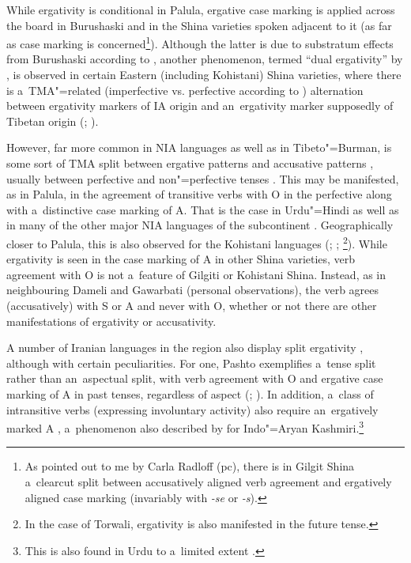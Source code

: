 While ergativity is conditional in Palula, ergative case marking is applied across the board in Burushaski and in the Shina varieties spoken adjacent to it (as far as case marking is concerned\footnote{As pointed out to me by Carla Radloff (pc), there is in Gilgit Shina a~clearcut split between accusatively aligned verb agreement and ergatively aligned case marking (invariably with \textit{-se} or \textit{-s}).}). Although the latter is due to substratum effects from Burushaski according to \citet[248]{masica2001}, another phenomenon, termed ``dual ergativity'' by \citet[213]{hookkoul2004}, is observed in certain Eastern (including Kohistani) Shina varieties, where there is a~TMA"=related (imperfective vs. perfective according to \citealt[51--53]{schmidtkohistani2008}) alternation between ergativity markers of IA origin and an~ergativity marker supposedly of Tibetan origin (\citealt[214]{hookkoul2004}; \citealt[211]{bailey1924}). 



However, far more common in NIA languages as well as in Tibeto"=Burman, is some sort of TMA split between ergative patterns and accusative patterns \citep[248]{masica2001}, usually between perfective and non"=perfective tenses \citep[342--343]{masica1991}. This may be manifested, as in Palula, in the agreement of transitive verbs with O in the perfective along with a~distinctive case marking of A. That is the case in Urdu"=Hindi \citep[124]{schmidt1999} as well as in many of the other major NIA languages of the subcontinent \citep[248]{masica2001}. Geographically closer to Palula, this is also observed for the Kohistani languages (\citealt[136]{baart1999a}; \citealt[34]{hallberghallberg1999}; \citealt[93--95]{lunsford2001}\footnote{In the case of Torwali, ergativity is also manifested in the future tense.}). While ergativity is seen in the case marking of A in other Shina varieties, verb agreement with O is not a~feature of Gilgiti or Kohistani Shina. Instead, as in neighbouring Dameli and Gawarbati (personal observations), the verb agrees (accusatively) with S or A and never with O, whether or not there are other manifestations of ergativity or accusativity.



A number of Iranian languages in the region also display split ergativity \citep{payne1980}, although with certain peculiarities. For one, Pashto exemplifies a~tense split rather than an~aspectual split, with verb agreement with O and ergative case marking of A in past tenses, regardless of aspect (\citealt[4--5]{tegey1977}; \citealt[71--72]{lorenz1979}). In addition, a~class of intransitive verbs (expressing involuntary activity) also require an~ergatively marked A \citep[112]{babrakzai1999}, a~phenomenon also described by \citet[217]{hookkoul2004} for Indo"=Aryan Kashmiri.\footnote{This is also found in Urdu to a~limited extent \citep[168]{schmidt1999}.} 



